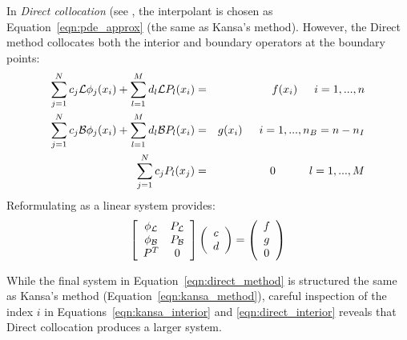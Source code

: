 \documentclass[11pt]{report}
\begin{document}
{In \emph{Direct collocation} (see \cite{Larsson2003, Fedoseyev2002}, the interpolant is chosen as Equation~\ref{eqn:pde_approx} (the same as Kansa's method). However, the Direct method collocates both the interior and boundary operators at the boundary points:
\begin{eqnarray}
\sum_{j=1}^{N}c_j\mathcal{L}\phi_j(x_i) + \sum_{l=1}^{M}d_l \mathcal{L}P_l(x_i) &=&f(x_i)  \hskip1.5em i = 1,...,n  \label{eqn:direct_interior} \\ 
\sum_{j=1}^{N}c_j\mathcal{B}\phi_j(x_i) + \sum_{l=1}^{M}d_l \mathcal{B}P_l(x_i) &=& g(x_i)  \hskip1.5em i = 1,..., n_B=n-n_I \label{eqn:direct_boundary} \nonumber \\
 \sum_{j=1}^{N} c_j P_l(x_j) &=& 0 \hskip3.0em l=1,...,M \label{eqn:direct_constraints} \nonumber 
\end{eqnarray}
Reformulating as a linear system provides: 
\begin{eqnarray}
\left[ \begin{array}{c c} 
	\phi_{\mathcal{L}} & P_{\mathcal{L}} \\
	\phi_{\mathcal{B}} & P_{\mathcal{B}} \\
	P^T  & 0 \\
	\end{array} \right] \left( \begin{array}{c}
							{c} \\
							{d}
							 \end{array}
						 \right) = \left( \begin{array}{c}
							{f} \\
							{g} \\
							0
							 \end{array}
						 \right) 
	\label{eqn:direct_method}
\end{eqnarray}

While the final system in Equation~\ref{eqn:direct_method} is structured the same as Kansa's method (Equation~\ref{eqn:kansa_method}), %
careful inspection of the index $i$ in Equations~\ref{eqn:kansa_interior} and \ref{eqn:direct_interior} reveals that Direct collocation produces a larger system. %


}
\end{document}
